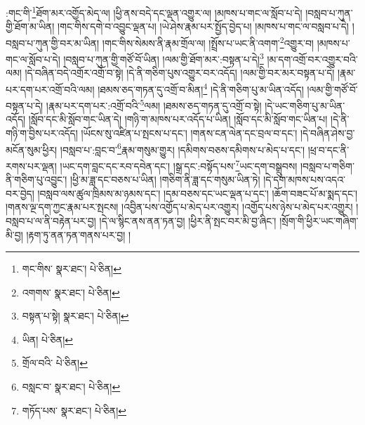 :གང་གི་\footnote{གང་གིས་  སྣར་ཐང་།  པེ་ཅིན། }ཐོག་མར་འགྱོད་མེད་ལ། །ཕྱི་ནས་བདེ་དང་ལྡན་འགྱུར་ལ། །མཁས་པ་གང་ལ་སློབ་པ་དེ། །བསླབ་པ་ཀུན་གྱི་ཐོག་མ་ཡིན། །གང་གིས་དགེ་བ་འབྱུང་ལྡན་པ། །ཡེ་ཤེས་རྣམ་པར་སྤྱོད་བྱེད་པ། །མཁས་པ་གང་ལ་བསླབ་པ་དེ། །བསླབ་པ་ཀུན་གྱི་བར་མ་ཡིན། །གང་གིས་སེམས་ནི་རྣམ་གྲོལ་ལ། །སྤྲོས་པ་ཡང་ནི་འགག་\footnote{འགགས་  སྣར་ཐང་།  པེ་ཅིན། }འགྱུར་བ། །མཁས་པ་གང་ལ་སློབ་པ་དེ། །བསླབ་པ་ཀུན་གྱི་གཙོ་བོ་ཡིན། །ལམ་གྱི་ཐོག་མར་:བསྟན་པ་དེ།\footnote{བསྟན་པ་སྟེ།  སྣར་ཐང་།  པེ་ཅིན། } །མ་དག་འགྲོ་བར་འགྱུར་བའི་ལམ། །དེ་བཞིན་བདེ་འགྲོར་འགྲོ་བ་སྟེ། །དེ་ནི་གཅིག་པུས་འགྱུར་བར་འདོད། །ལམ་གྱི་བར་མར་བསྟན་པ་དེ། །རྣམ་པར་དག་པར་འགྲོ་བའི་ལམ། །ཐམས་ཅད་གཏན་དུ་འགྲོ་བ་མིན།\footnote{ཡིན།  པེ་ཅིན། } །དེ་ནི་གཅིག་པུ་མ་ཡིན་འདོད། །ལམ་གྱི་གཙོ་བོ་བསྟན་པ་དེ། །རྣམ་པར་དག་པར་:འགྲོ་བའི་\footnote{གྲོལ་བའི་  པེ་ཅིན། }ལམ། །ཐམས་ཅད་གཏན་དུ་འགྲོ་བ་སྟེ། །དེ་ཡང་གཅིག་པུ་མ་ཡིན་འདོད། །སློབ་དང་མི་སློབ་གང་ཡིན་དེ། །གཉི་ག་མཁས་པར་འདོད་པ་ཡིན། །སློབ་དང་མི་སློབ་གང་ཡིན་པ། །དེ་ནི་གཉི་ག་བྱིས་པར་འདོད། །ཡོངས་སུ་འཛིན་པ་སྤངས་པ་དང་། །གནས་ངན་ལེན་དང་བྲལ་བ་དང་། །དེ་བཞིན་ཤེས་བྱ་མངོན་སུམ་ཕྱིར། །བསླབ་པ་:བླང་བ་\footnote{བསླང་བ་  སྣར་ཐང་།  པེ་ཅིན། }རྣམ་གསུམ་གྱུར། །དམིགས་བཅས་དམིགས་པ་མེད་པ་དང་། །ཕྲ་བ་དང་ནི་རགས་པར་ལྡན། །ཡང་དག་བླང་དང་རབ་དབེན་དང་། །སྒྲ་དང་:བསྟོད་པས་\footnote{གཏོད་པས་  སྣར་ཐང་།  པེ་ཅིན། }ཡང་དག་བསྒྲུབས། །བསླབ་པ་གཅིག་ནི་གཅིག་པུ་འབྱུང་། །ཕྱི་མ་ཟླ་དང་བཅས་པ་ཡིན། །གཅིག་ནི་ཟླ་དང་གསུམ་ཡིན་ཏེ། །དེ་དག་མཁས་པས་འདའ་བར་བྱེད། །བསླབ་ལས་ཚུལ་ཁྲིམས་མ་ཉམས་དང་། །དམ་བཅས་དང་ཡང་ལྡན་པ་དང་། །ཆོག་བཟང་པོ་མ་སྨད་དང་། །གནས་ལྔ་དག་ཀྱང་རྣམ་པར་སྤངས། །འབྱིན་པས་འགྱོད་པ་མེད་པར་འགྱུར། །འགྱོད་པས་ཉེས་པ་མེད་པར་འགྱུར། །བསླབ་པ་ལ་ནི་བརྟེན་པར་བྱ། །དེ་ལ་སྙིང་ནས་ནན་ཏན་བྱ། །ཕྱིར་ནི་སྤང་བར་མི་བྱ་ཞིང་། །སྲོག་གི་ཕྱིར་ཡང་གཞིག་མི་བྱ། །རྟག་ཏུ་ནན་ཏན་གནས་པར་བྱ། །
